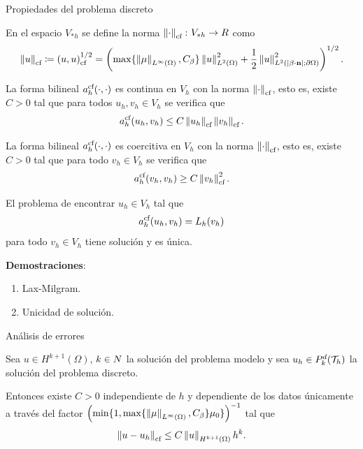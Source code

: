 	\begin{frame}[allowframebreaks]{Propiedades del problema discreto}
	\begin{definicion}
		En el espacio $V_{*h}$ se define la norma $\left\|\cdot\right\|_{\text{cf}}\colon V_{*h}\to\relax R$ como $$\left\|u\right\|_{\text{cf}}\coloneqq\left(u,u\right)_\text{cf}^{1/2}= \left(\max\{\left\|\mu\right\|_{L^\infty(\Omega)},C_\beta\}\left\|u\right\|_{L^2(\Omega)}^2+\frac{1}{2}\left\|u\right\|_{L^2(|\beta\cdot\mathbf{n}|;\partial\Omega)}^2\right)^{1/2}.$$
	\end{definicion}
	\framebreak
	\begin{lemma}
		La forma bilineal $a_h^{\text{cf}}(\cdot,\cdot)$ es continua en $V_h$ con la norma $\left\|\cdot\right\|_{\text{cf}}$, esto es, existe $C>0$ tal que para todos $u_h,v_h\in V_h$ se verifica que $$a_h^{\text{cf}}(u_h,v_h)\leq C\left\|u_h\right\|_{\text{cf}}\left\|v_h\right\|_{\text{cf}}.$$
	\end{lemma}
	
	\begin{lemma}
		La forma bilineal $a_h^{\text{cf}}(\cdot,\cdot)$ es coercitiva en $V_h$ con la norma $\left\|\cdot\right\|_{\text{cf}}$, esto es, existe $C>0$ tal que para todo $v_h\in V_h$ se verifica que $$a_h^{\text{cf}}(v_h,v_h)\geq C\left\|v_h\right\|_{\text{cf}}^2.$$
	\end{lemma}
	\framebreak
	\begin{lemma}
		El problema de encontrar $u_h\in V_h$ tal que $$a_h^{\text{cf}}(u_h,v_h)=L_h(v_h)$$ para todo $v_h\in V_h$ tiene solución y es única.
	\end{lemma}
	\textbf{Demostraciones}:
	\begin{enumerate}
		\item Lax-Milgram.
		\item Unicidad de solución.
	\end{enumerate}
	
	\end{frame}
	
	\begin{frame}{Análisis de errores}
	\begin{theorem}
		\label{theorem:hiperbolico_CF_orden_norma_CF}
		Sea $u\in H^{k+1}(\Omega)$, $k\in\relax N$ la solución del problema modelo y sea $u_h\in \relax{P}_k^d(\mathcal{T}_h)$ la solución del problema discreto.
		
		Entonces existe $C>0$ independiente de $h$ y dependiente de los datos únicamente a través del factor $\left(\min\{1,\max\{\left\|\mu\right\|_{L^\infty(\Omega)},C_\beta\}\mu_0\}\right)^{-1}$ tal que
		\begin{equation*}
		\label{theorem:orden_convergencia_CF}
		\left\|u-u_h\right\|_{\text{cf}}\leq C\left\|u\right\|_{H^{k+1}(\Omega)}h^k.
		\end{equation*}
	\end{theorem}
	\end{frame}
	
